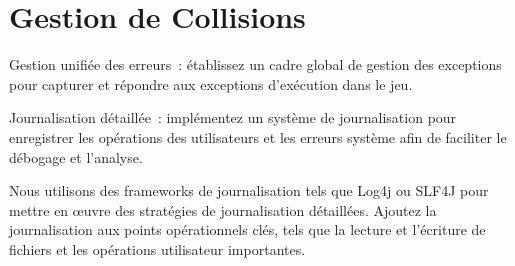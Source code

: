 \documentclass[11pt,english]{article}
\begin{document}
\large

\section{Gestion de Collisions}

\indent

Gestion unifiée des erreurs : établissez un cadre global de gestion des exceptions pour capturer et répondre aux exceptions d'exécution dans le jeu.

\indent Journalisation détaillée : implémentez un système de journalisation pour enregistrer les opérations des utilisateurs et les erreurs système afin de faciliter le débogage et l'analyse.

\indent Nous utilisons des frameworks de journalisation tels que Log4j ou SLF4J pour mettre en œuvre des stratégies de journalisation détaillées. Ajoutez la journalisation aux points opérationnels clés, tels que la lecture et l’écriture de fichiers et les opérations utilisateur importantes.
\end{document}
